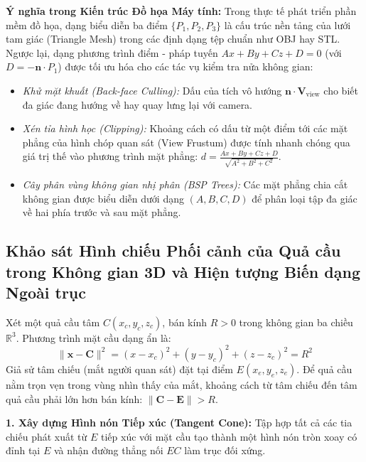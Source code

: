 \textbf{Ý nghĩa trong Kiến trúc Đồ họa Máy tính:}
Trong thực tế phát triển phần mềm đồ họa, dạng biểu diễn ba điểm $\{P_1, P_2, P_3\}$ là cấu trúc nền tảng của lưới tam giác (Triangle Mesh) trong các định dạng tệp chuẩn như OBJ hay STL. Ngược lại, dạng phương trình điểm - pháp tuyến $Ax + By + Cz + D = 0$ (với $D = -\mathbf{n} \cdot P_1$) được tối ưu hóa cho các tác vụ kiểm tra nửa không gian:
\begin{itemize}
    \item \textit{Khử mặt khuất (Back-face Culling):} Dấu của tích vô hướng $\mathbf{n} \cdot \mathbf{V}_{\text{view}}$ cho biết đa giác đang hướng về hay quay lưng lại với camera.
    \item \textit{Xén tỉa hình học (Clipping):} Khoảng cách có dấu từ một điểm tới các mặt phẳng của hình chóp quan sát (View Frustum) được tính nhanh chóng qua giá trị thế vào phương trình mặt phẳng: $d = \frac{Ax + By + Cz + D}{\sqrt{A^2 + B^2 + C^2}}$.
    \item \textit{Cây phân vùng không gian nhị phân (BSP Trees):} Các mặt phẳng chia cắt không gian được biểu diễn dưới dạng $(A, B, C, D)$ để phân loại tập đa giác về hai phía trước và sau mặt phẳng.
\end{itemize}

\subsection{Khảo sát Hình chiếu Phối cảnh của Quả cầu trong Không gian 3D và Hiện tượng Biến dạng Ngoài trục}
\label{subsec:sphere_perspective_projection}

Xét một quả cầu tâm $C(x_c, y_c, z_c)$, bán kính $R > 0$ trong không gian ba chiều $\mathbb{R}^3$. Phương trình mặt cầu dạng ẩn là:
\begin{equation}
\label{eq:sphere_implicit_def}
\|\mathbf{x} - \mathbf{C}\|^2 = (x - x_c)^2 + (y - y_c)^2 + (z - z_c)^2 = R^2
\end{equation}
Giả sử tâm chiếu (mắt người quan sát) đặt tại điểm $E(x_e, y_e, z_e)$. Để quả cầu nằm trọn vẹn trong vùng nhìn thấy của mắt, khoảng cách từ tâm chiếu đến tâm quả cầu phải lớn hơn bán kính: $\|\mathbf{C} - \mathbf{E}\| > R$.

\textbf{1. Xây dựng Hình nón Tiếp xúc (Tangent Cone):}
Tập hợp tất cả các tia chiếu phát xuất từ $E$ tiếp xúc với mặt cầu tạo thành một hình nón tròn xoay có đỉnh tại $E$ và nhận đường thẳng nối $EC$ làm trục đối xứng.

